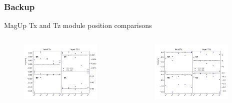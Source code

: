 \documentclass[aspectratio=1610, 12pt]{beamer}
\begin{document}
\begin{frame}\frametitle{Backup}
  MagUp Tx and Tz module position comparisons
  \begin{columns}
    \begin{column}[c]{0.48\textwidth}
      \begin{figure}
        \includegraphics[width=0.9\textwidth]{plots/stability_plots/diff_MU_T1U_Tx.pdf}
      \end{figure}
    \end{column}
    \begin{column}[c]{0.48\textwidth}
      \begin{figure}
        \includegraphics[width=0.9\textwidth]{plots/stability_plots/diff_MU_T1U_Tz.pdf}
      \end{figure}
    \end{column}
  \end{columns}
\end{frame}
\end{document}
